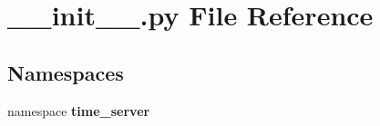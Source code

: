 \section{\-\_\-\-\_\-init\-\_\-\-\_\-.\-py \-File \-Reference}
\label{____init_____8py}
\subsection*{\-Namespaces}
\begin{DoxyCompactItemize}
\item 
namespace {\bf time\-\_\-server}
\end{DoxyCompactItemize}
